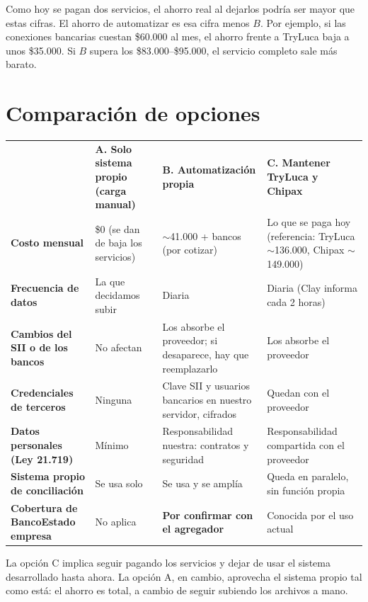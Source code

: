 \documentclass[11pt,a4paper]{article}
\newcommand{\tablahead}[1]{{\color{white}\sffamily\bfseries #1}}
\begin{document}
Como hoy se pagan dos servicios, el ahorro real al dejarlos podría ser mayor que estas cifras. El ahorro de automatizar es esa cifra menos $B$. Por ejemplo, si las conexiones bancarias cuestan \$60.000 al mes, el ahorro frente a TryLuca baja a unos \$35.000. Si $B$ supera los \$83.000--\$95.000, el servicio completo sale más barato.

\section{Comparación de opciones}

\begin{center}
\small
\begin{tabularx}{\textwidth}{@{}>{\RaggedRight\sffamily\bfseries}p{2.6cm} L L L@{}}
\rowcolor{azul}\tablahead{} & \tablahead{A. Solo sistema propio (carga manual)} & \tablahead{B. Automatización propia} & \tablahead{C. Mantener TryLuca y Chipax} \\
Costo mensual & \$0 (se dan de baja los servicios) & $\sim$41.000 + bancos (por cotizar) & Lo que se paga hoy (referencia: TryLuca $\sim$136.000, Chipax $\sim$149.000) \\
Frecuencia de datos & La que decidamos subir & Diaria & Diaria (Clay informa cada 2 horas) \\
Cambios del SII o de los bancos & No afectan & Los absorbe el proveedor; si desaparece, hay que reemplazarlo & Los absorbe el proveedor \\
Credenciales de terceros & Ninguna & Clave SII y usuarios bancarios en nuestro servidor, cifrados & Quedan con el proveedor \\
Datos personales (Ley 21.719) & Mínimo & Responsabilidad nuestra: contratos y seguridad & Responsabilidad compartida con el proveedor \\
Sistema propio de conciliación & Se usa solo & Se usa y se amplía & Queda en paralelo, sin función propia \\
Cobertura de BancoEstado empresa & No aplica & \textbf{Por confirmar con el agregador} & Conocida por el uso actual \\
\end{tabularx}
\end{center}

La opción C implica seguir pagando los servicios y dejar de usar el sistema desarrollado hasta ahora. La opción A, en cambio, aprovecha el sistema propio tal como está: el ahorro es total, a cambio de seguir subiendo los archivos a mano.
\end{document}
